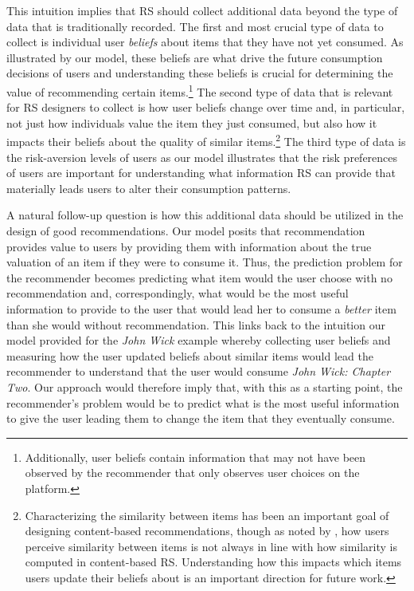 \documentclass[manuscript]{acmart}
\begin{document}
This intuition implies that RS should collect additional data beyond the type of data that is traditionally recorded. The first and most crucial type of data to collect is individual user \textit{beliefs} about items that they have not yet consumed. As illustrated by our model, these beliefs are what drive the future consumption decisions of users and understanding these beliefs is crucial for determining the value of recommending certain items.\footnote{Additionally, user beliefs contain information that may not have been observed by the recommender that only observes user choices on the platform.} The second type of data that is relevant for RS designers to collect is how user beliefs change over time and, in particular, not just how individuals value the item they just consumed, but also how it impacts their beliefs about the quality of similar items.\footnote{Characterizing the similarity between items has been an important goal of designing content-based recommendations, though as noted by \cite{winecoff2019users}, how users perceive similarity between items is not always in line with how similarity is computed in content-based RS. Understanding how this impacts which items users update their beliefs about is an important direction for future work.} The third type of data is the risk-aversion levels of users as our model illustrates that the risk preferences of users are important for understanding what information RS can provide that materially leads users to alter their consumption patterns.
\par 
A natural follow-up question is how this additional data should be utilized in the design of good recommendations. Our model posits that recommendation provides value to users by providing them with information about the true valuation of an item if they were to consume it. Thus, the prediction problem for the recommender becomes predicting what item would the user choose with no recommendation and, correspondingly, what would be the most useful information to provide to the user that would lead her to consume a \textit{better} item than she would without recommendation. This links back to the intuition our model provided for the \textit{John Wick} example whereby collecting user beliefs and measuring how the user updated beliefs about similar items would lead the recommender to understand that the user would consume \textit{John Wick: Chapter Two}. Our approach would therefore imply that, with this as a starting point, the recommender's problem would be to predict what is the most useful information to give the user leading them to change the item that they eventually consume.
\end{document}
